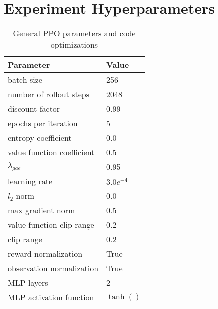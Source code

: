 
\chapter{Experiment Hyperparameters}
\label{ch:Hyperparameters}
\begin{table}[ht!]
	\caption{General PPO parameters \citep{SchulmanWDRK17} and code optimizations \citep{PPOHacks2020}}
	\vspace*{0.5cm}
	\centering
	\begin{tabular}{ll}
		\toprule
		Parameter & Value \\
        \midrule
        \midrule
		batch size & 256 \\
        number of rollout steps & 2048 \\
        discount factor & 0.99 \\
        epochs per iteration & 5 \\     
        entropy coefficient & 0.0 \\
        value function coefficient & 0.5 \\
        $\lambda_{gae}$ & 0.95 \\
        learning rate & $3.0e^{-4}$ \\
        $l_2$ norm & 0.0 \\
        max gradient norm & 0.5 \\
        value function clip range & 0.2 \\
        clip range & 0.2 \\
        reward normalization & True \\
        observation normalization & True \\
        \midrule
        MLP layers & 2\\
        MLP activation function & $\tanh()$\\
		\bottomrule
	\end{tabular}
\end{table}
